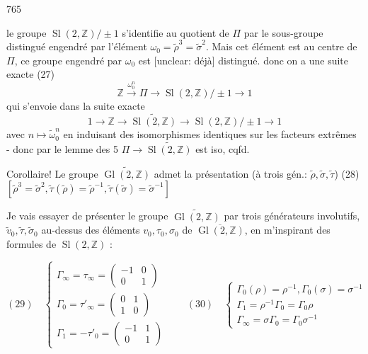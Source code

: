 \newpage


765

le groupe $\operatorname{Sl}(2, \mathbb{Z})/\pm 1$ s'identifie au
quotient de $\Pi$ par le sous-groupe distingué
engendré par l'élément $\omega_0 = \tilde{\rho}^3 = \tilde{\sigma}^2$.
Mais cet élément est au centre de $\Pi$, ce groupe
engendré par $\omega_0$ est [unclear: déjà] distingué.
donc on a une suite exacte
(27) $$ \mathbb{Z} \xrightarrow{\omega_0^n} \Pi \longrightarrow \operatorname{Sl}(2, \mathbb{Z})/\pm 1 \longrightarrow 1 $$
qui s'envoie dans la suite exacte
$$ 1 \longrightarrow \mathbb{Z} \longrightarrow \widetilde{\operatorname{Sl}(2, \mathbb{Z})} \longrightarrow \operatorname{Sl}(2, \mathbb{Z})/\pm 1 \longrightarrow 1 $$
avec $n \mapsto \tilde{\omega}_0^n$
en induisant des isomorphismes identiques sur les facteurs
extrêmes - donc par le lemme des 5
$\Pi \longrightarrow \widetilde{\operatorname{Sl}(2, \mathbb{Z})}$ est iso, cqfd.

Corollaire! Le groupe $\widetilde{\operatorname{Gl}(2, \mathbb{Z})}$ admet
la présentation (à trois gén.: $\tilde{\rho}, \tilde{\sigma}, \tilde{\tau}$)
(28) $[ \tilde{\rho}^3 = \tilde{\sigma}^2, \tilde{\tau}(\tilde{\rho}) = \tilde{\rho}^{-1}, \tilde{\tau}(\tilde{\sigma}) = \tilde{\sigma}^{-1} ]$

Je vais essayer de présenter le groupe
$\widetilde{\operatorname{Gl}(2, \mathbb{Z})}$ par trois générateurs involutifs,
$\tilde{v}_0, \tilde{\tau}, \tilde{\sigma}_0$ au-dessus des éléments
$v_0, \tau_0, \sigma_0$ de $\overline{\operatorname{Gl}(2, \mathbb{Z})}$, en m'inspirant
des formules de $\operatorname{Sl}(2, \mathbb{Z})$ :

\newpage


$$
(29) \quad \begin{cases}
\Gamma_\infty = \tau_\infty = \begin{pmatrix} -1 & 0 \\ 0 & 1 \end{pmatrix} \\
\Gamma_0 = \tau'_\infty = \begin{pmatrix} 0 & 1 \\ 1 & 0 \end{pmatrix} \\
\Gamma_1 = -\tau'_0 = \begin{pmatrix} -1 & 1 \\ 0 & 1 \end{pmatrix}
\end{cases}
\qquad
(30) \quad \begin{cases}
\Gamma_0(\rho) = \rho^{-1}, \Gamma_0(\sigma) = \sigma^{-1} \\
\Gamma_1 = \rho^{-1} \Gamma_0 = \Gamma_0 \rho \\
\Gamma_\infty = \sigma \Gamma_0 = \Gamma_0 \sigma^{-1}
\end{cases}
$$

